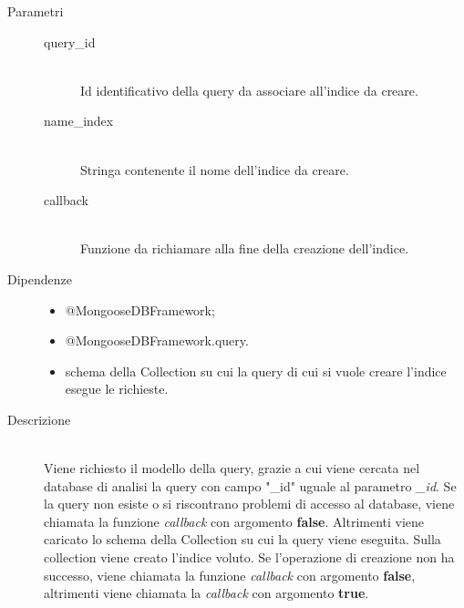 \begin{description}
\begin{mldescription}
       \begin{description}
   	 \item[Parametri] \hfill
   	  \begin{description}
   	   \item[query\_id] \hfill \\
   	   Id identificativo della query da associare all'indice da creare.
   	   \item[name\_index] \hfill \\
   	   Stringa contenente il nome dell'indice da creare.
   	   \item[callback] \hfill \\
   	   Funzione da richiamare alla fine della creazione dell'indice.
   	  \end{description}
   	 \item[Dipendenze] \hfill
   	  \begin{itemize}
   	   \item @MongooseDBFramework;	   
   	   \item @MongooseDBFramework.query.
   	   \item schema della Collection su cui la query di cui si vuole creare l'indice esegue le richieste.
   	  \end{itemize}
   	 \item[Descrizione] \hfill \\
   	 Viene richiesto il modello della query, grazie a cui viene cercata nel database di analisi la query con campo "\_id" uguale al parametro \textit{\_id}. Se la query non esiste o si riscontrano problemi di accesso al database, viene chiamata la funzione \textit{callback} con argomento \textbf{false}. Altrimenti viene caricato lo schema della Collection su cui la query viene eseguita. Sulla collection viene creato l'indice voluto. Se l'operazione di creazione non ha successo, viene chiamata la funzione \textit{callback} con argomento \textbf{false}, altrimenti viene chiamata la \textit{callback} con argomento \textbf{true}.
   	\end{description}	    
      

\end{mldescription}
\end{description}
